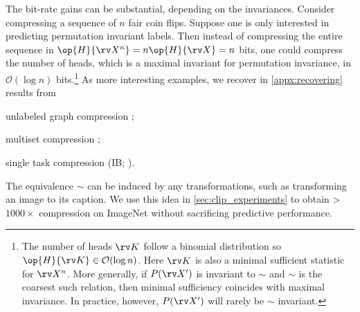 \documentclass[final]{article}
\begin{document}
The bit-rate gains can be substantial, depending on the invariances.
Consider compressing a sequence of $n$ \iid fair coin flips.
 Suppose one is only interested in predicting permutation invariant labels.
 Then instead of compressing the entire sequence in $\op{H}{\rv X^n}=n\op{H}{\rv X}= n$ bits, one could compress the number of heads, which is a maximal invariant for permutation invariance, in $\mathcal{O}(\log n)$ bits.\footnote{The number of heads $\rv K$ follow a binomial distribution so $\op{H}{\rv K} \in \mathcal{O}(\log n)$.
 Here $\rv K$ is also a minimal sufficient statistic for $\rv X^n$.
 More generally, if $P(\rv X')$ is invariant to $\sim$ and $\sim$ is the coarsest such relation, then minimal sufficiency coincides with maximal invariance.
In practice, however, $P(\rv X')$ will rarely be $\sim$ invariant.
 }
As more interesting examples, we recover in \cref{appx:recovering} results from \begin{inlinelist}
\item unlabeled graph compression \cite{rashevsky_life_1955};
\item multiset compression \cite{varshney_benefiting_2007};
\item single task compression (IB; \cite{tishby_information_2000}).
\end{inlinelist}
The equivalence $\sim$ can be induced by any transformations, such as transforming an image to its caption. 
We use this idea in \cref{sec:clip_experiments} to obtain >$1000\times$ compression on ImageNet without sacrificing predictive performance.  
\end{document}
